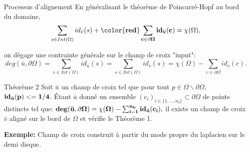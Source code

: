 \documentclass[compress,10pt,aspectratio=169]{beamer}
\begin{document}
\begin{frame}{Processus d'alignement}
\vspace{-0.2cm}
\small
En généralisant le théorème de Poincarré-Hopf au bord du domaine,
\begin{equation*}
\sum_{s\in Int(\Omega)} id_{\bar{v}}(s)+{\bf \color{red}\sum_{c\in \partial\Omega} id_{\bar{v}}(c)} = \chi(\Omega),
\label{poincareformula_3}
\end{equation*}

on dégage une contrainte générale sur le champ de croix "input":
\begin{equation*}
deg(\bar{u}, \partial\Omega) =\sum_{s\in Int(\Omega)} id_{\bar{u}}(s) = \sum_{s\in Int(\Omega)} id_{\bar{v}}(s) = \chi(\Omega)-\sum_{c\in \partial \Omega} id_{\bar{v}}(c).
\label{third_u_c}
\end{equation*}
\begin{onerablock}{Théorème 2}
Soit $\bar{u}$ un champ de croix tel que pour tout $p\in\Omega\backslash\partial\Omega$, ${\bf id_{\bar{u}}(p)<=1/4}$. \'Etant $\bar{u}$ donné un ensemble $(c_i)_{i\in\{1,\dots,n_b\}}\subset\partial\Omega$ de points distincts tel que:
$
{\bf deg(\bar{u}, \partial\Omega) = \chi(\Omega)-\sum_{i=1}^{n_b} id_{\bar{u}}(c_i),}
$
il existe un champ de croix $\bar{v}$ aligné sur le bord de $\Omega$ et vérifie le Théorème 1.
\end{onerablock}
\vspace{0.1cm}
{\bf Exemple:} Champ de croix construit à partir du mode propre du laplacien sur le demi disque.
\end{frame}
\end{document}
